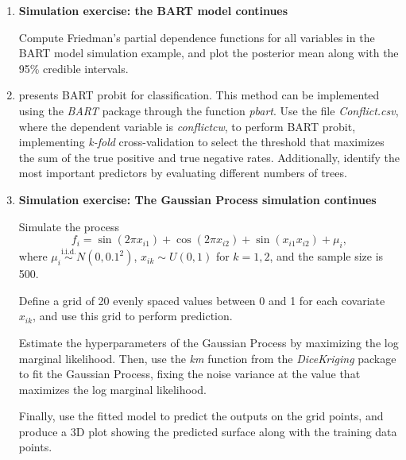 \begin{enumerate}
	\item \textbf{Simulation exercise: the BART model continues} 
	
	Compute Friedman’s partial dependence functions \cite{friedman2001greedy} for all variables in the BART model simulation example, and plot the posterior mean along with the 95\% credible intervals.
	
	\item \cite{chipman2010bart} presents BART probit for classification. This method can be implemented using the \textit{BART} package through the function \textit{pbart}. Use the file \textit{Conflict.csv}, where the dependent variable is \textit{conflictcw}, to perform BART probit, implementing \textit{k-fold} cross-validation to select the threshold that maximizes the sum of the true positive and true negative rates. Additionally, identify the most important predictors by evaluating different numbers of trees.
	
	
	\item \textbf{Simulation exercise: The Gaussian Process simulation continues}
	
	Simulate the process
	\[
	f_i = \sin(2\pi x_{i1}) + \cos(2\pi x_{i2}) + \sin(x_{i1} x_{i2}) + \mu_i,
	\]
	where \( \mu_i \overset{\text{i.i.d.}}{\sim} {N}(0, 0.1^2) \), \( x_{ik} \sim {U}(0,1) \) for \( k = 1, 2 \), and the sample size is 500. 
	
	Define a grid of 20 evenly spaced values between 0 and 1 for each covariate \( x_{ik} \), and use this grid to perform prediction.
	
	Estimate the hyperparameters of the Gaussian Process by maximizing the log marginal likelihood. Then, use the \textit{km} function from the \textit{DiceKriging} package to fit the Gaussian Process, fixing the noise variance at the value that maximizes the log marginal likelihood.
	
	Finally, use the fitted model to predict the outputs on the grid points, and produce a 3D plot showing the predicted surface along with the training data points.
	
	
	
	  
\end{enumerate}

